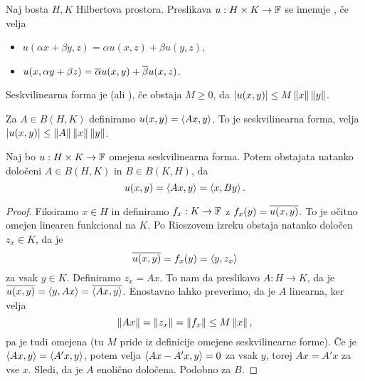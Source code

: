 
\begin{definicija}
  Naj bosta $H, K$ Hilbertova prostora.
  Preslikava $u: H \times K \to \mathbb{F}$ se imenuje , če
  velja
  \begin{itemize}
  \item $u(\alpha x + \beta y, z) = \alpha u(x, z) + \beta u(y, z)$,
  \item $u(x, \alpha y + \beta z) = \overline{\alpha} u(x,y) + \overline{\beta} u(x,z)$.
  \end{itemize}
\end{definicija}

\begin{definicija}
  Seskvilinearna forma je  (ali ), če obstaja $M
  \ge 0$, da $\left| u(x,y) \right| \le M \left\lVert x\right\rVert \left\lVert y\right\rVert$.
\end{definicija}


\begin{primer}
  Za $A \in B(H, K)$ definiramo $u(x,y) = \left< Ax,y \right>$.
  To je seskvilinearna forma, velja $\left| u(x,y) \right| \le \left\lVert A\right\rVert \left\lVert x\right\rVert
  \left\lVert y\right\rVert$.
\end{primer}

\begin{izrek}
  Naj bo $u: H \times K \to \mathbb{F}$ omejena seskvilinearna forma.
  Potem obstajata natanko določeni $A \in B(H,K)$ in $B \in B(K,H)$, da
  \[
	u(x,y) = \left< Ax,y \right> = \left< x, By \right>.
  \]
\end{izrek}

\begin{proof}
  Fiksiramo $x \in H$ in definiramo $f_x: K \to \mathbb{F}$ z $f_x(y) = \overline{u(x,y)}$.
  To je očitno omejen linearen funkcional na $K$.
  Po Rieszovem izreku obstaja natanko določen $z_x \in K$, da je
  \[
	\overline{u(x,y)} = f_x(y) = \left< y, z_x \right>
  \]
  za vsak $y \in K$.
  Definiramo $z_x = Ax$.
  To nam da preslikavo $A: H \to K$, da je $\overline{u(x,y)} = \left< y, Ax \right> =
  \overline{\left< Ax, y \right>}$.
  Enostavno lahko preverimo, da je $A$ linearna, ker velja
  \[
	\left\lVert Ax\right\rVert = \left\lVert z_x\right\rVert = \left\lVert f_x\right\rVert \le M \left\lVert x\right\rVert,
  \]
  pa je tudi omejena (tu $M$ pride iz definicije omejene seskvilinearne forme).
  Če je $\left< Ax, y \right> = \left< A' x, y \right>$, potem velja $\left< Ax - A'x, y \right> = 0$ za vsak
  $y$, torej $Ax = A'x$ za vse $x$.
  Sledi, da je $A$ enolično določena.
  Podobno za $B$.
\end{proof}

